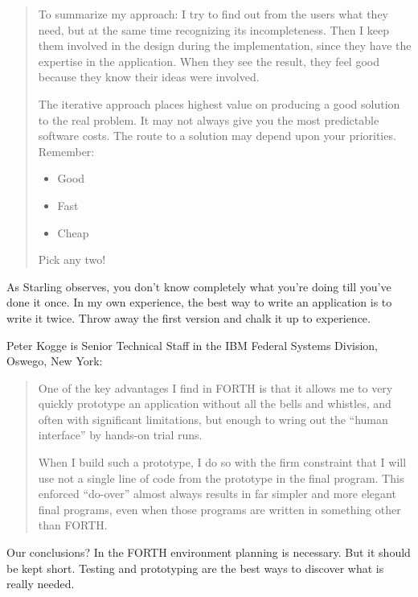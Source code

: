 \begin{quotation}
\noindent To summarize my approach: I try to find out from the users what they
need, but at the same time recognizing its incompleteness. Then I keep
them involved in the design during the implementation, since they have the
expertise in the application.
When they see the result, they feel good because they know their ideas were
involved.

\noindent The iterative approach places highest value on producing a good solution to
the real problem. It may not always give you the most predictable software
costs. The route to a solution may depend upon your priorities. Remember:

\begin{itemize}
\item Good
\item Fast
\item Cheap
\end{itemize}

\noindent Pick any two!
\end{quotation}
\blackline{2ex}

\noindent As Starling observes, you don't know completely what you're doing till
you've done it once. In my own experience, the best way to write an
application is to write it twice. Throw away the first version and chalk it up
to experience.

\blackline{2ex}
\noindent Peter Kogge is Senior Technical Staff in the IBM Federal Systems
Division, Oswego, New York:

\begin{quotation}
\noindent One of the key advantages I find in FORTH is that it allows me to very
quickly prototype an application without all the bells and whistles, and
often with significant limitations, but enough to wring out the ``human
interface'' by hands-on trial runs.

When I build such a prototype, I do so with the firm constraint that I will
use not a single line of code from the prototype in the final program. This
enforced ``do-over'' almost always results in far simpler and more elegant
final programs, even when those programs are written in something other
than FORTH.
\end{quotation}
\blackline{2ex}

\noindent Our conclusions? In the FORTH environment planning is necessary. But
it should be kept short. Testing and prototyping are the best ways to
discover what is really needed.

